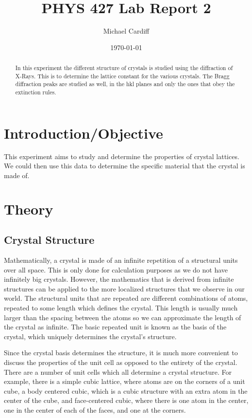 \documentclass[letterpaper,12pt]{article}
\begin{document}
\title{PHYS 427 Lab Report 2}
\author{Michael Cardiff}
\date{\today}
\maketitle

\begin{abstract}
  In this experiment the different structure of crystals is studied using the diffraction of X-Rays. This is to determine the lattice constant for the various crystals. The Bragg diffraction peaks are studied as well, in the hkl planes and only the ones that obey the extinction rules.
\end{abstract}
\section{Introduction/Objective}
This experiment aims to study and determine the properties of crystal lattices. We could then use this data to determine the specific material that the crystal is made of. 

\section{Theory}

\subsection{Crystal Structure}
Mathematically, a crystal is made of an infinite repetition of a structural units over all space. This is only done for calculation purposes as we do not have infinitely big crystals. However, the mathematics that is derived from infinite structures can be applied to the more localized structures that we observe in our world. The structural units that are repeated are different combinations of atoms, repeated to some length which defines the crystal. This length is usually much larger than the spacing between the atoms so we can approximate the length of the crystal as infinite. The basic repeated unit is known as the basis of the crystal, which uniquely determines the crystal's structure.

Since the crystal basis determines the structure, it is much more convenient to discuss the properties of the unit cell as opposed to the entirety of the crystal. There are a number of unit cells which all determine a crystal structure. For example, there is a simple cubic lattice, where atoms are on the corners of a unit cube, a body centered cubic, which is a cubic structure with an extra atom in the center of the cube, and face-centered cubic, where there is one atom in the center, one in the center of each of the faces, and one at the corners. 
\end{document}
